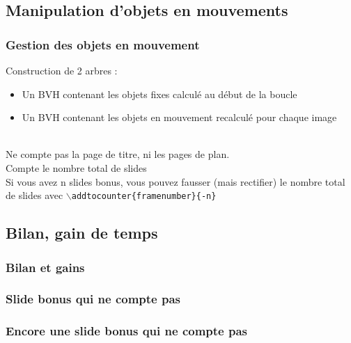 \subsection{Manipulation d'objets en mouvements}
\begin{frame}[fragile]
\frametitle{Gestion des objets en mouvement}
Construction de 2 arbres : 
\begin{itemize}
    \item Un BVH contenant les objets fixes calculé au début de la boucle
    \item Un BVH contenant les objets en mouvement recalculé pour chaque image
\end{itemize}
\\[1cm]

Ne compte pas la page de titre, ni les pages de plan. \\[1cm]
Compte le nombre total de slides\\[1cm]
Si vous avez n slides bonus, vous pouvez fausser (mais rectifier) 
le nombre total de slides avec  \texttt{$\backslash$addtocounter\{framenumber\}\{-n\} } 
\end{frame}


\subsection{Bilan, gain de temps}
\begin{frame}[fragile]
\frametitle{Bilan et gains}
\label{derniere_slide_effective}
\end{frame}


\begin{frame}[fragile]
\frametitle{Slide bonus qui ne compte pas}
\end{frame}


\begin{frame}[fragile]
\frametitle{Encore une slide bonus qui ne compte pas}
\end{frame}
\addtocounter{framenumber}{-2} 


